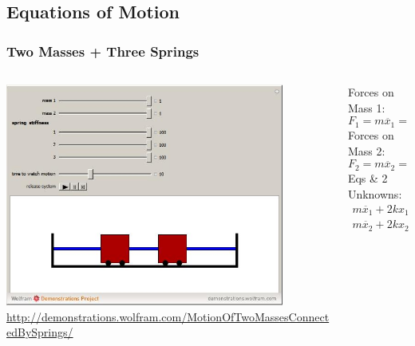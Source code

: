 \documentclass[pdf,hideothersubsections]{beamer}
\begin{document}
\subsection{Equations of Motion}
\begin{frame}
\frametitle{Two Masses + Three Springs}
\begin{columns}

  \begin{column}{0.5\textwidth}
\pause
    \includegraphics[width=0.85\textwidth]{2masses3springs-cdf.jpg}
\url{http://demonstrations.wolfram.com/MotionOfTwoMassesConnectedBySprings/}
  \end{column}

  \begin{column}{0.5\textwidth}
    \pause
    Forces on Mass 1:
    \begin{equation}
      F_1 = m \ddot{x_1} = -k x_1 + k (x_2 - x_1)
    \end{equation}
    \pause
    Forces on Mass 2:
    \begin{equation}
      F_2 = m \ddot{x_2} = -k x_2 - k (x_2 - x_1)
    \end{equation}
     Eqs \& 2 Unknowns:
    \begin{align}
      m \ddot{x_1} + 2 k x_1 - k x_2 &= 0 \\
      m \ddot{x_2} + 2 k x_2 - k x_1 &= 0
    \end{align}
  \end{column}

\end{columns}
\end{frame}
\end{document}
